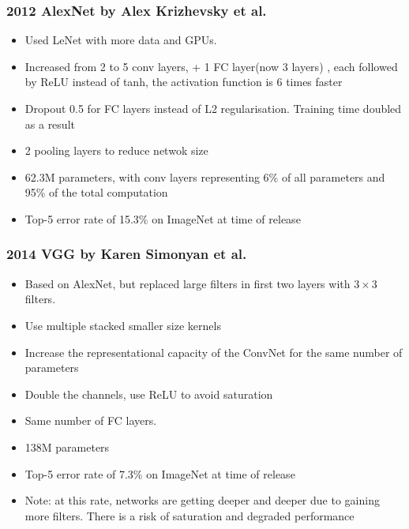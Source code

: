 \subsubsection{2012 AlexNet by Alex Krizhevsky et al.}
\begin{itemize}
    \item Used LeNet with more data and GPUs.
    \item Increased from 2 to 5 conv layers, + 1 FC layer(now 3 layers) , each followed by ReLU instead of tanh, the activation function is 6 times faster
    \item Dropout 0.5 for FC layers instead of L2 regularisation. Training time doubled as a result
    \item 2 pooling layers to reduce netwok size
    \item 62.3M parameters, with conv layers representing 6\% of all parameters and 95\% of the total computation
    \item Top-5 error rate of 15.3\% on ImageNet at time of release
\end{itemize}

\subsubsection{2014 VGG by Karen Simonyan et al.}
\begin{itemize}
    \item Based on AlexNet, but replaced large filters in first two layers with $3\times 3$ filters.
    \item Use multiple stacked smaller size kernels
    \item Increase the representational capacity of the ConvNet for the same number of parameters
    \item Double the channels, use ReLU to avoid saturation
    \item Same number of FC layers.
    \item 138M parameters
    \item Top-5 error rate of 7.3\% on ImageNet at time of release
    \item Note: at this rate, networks are getting deeper and deeper due to gaining more filters. There is a risk of saturation and degraded performance
\end{itemize}

